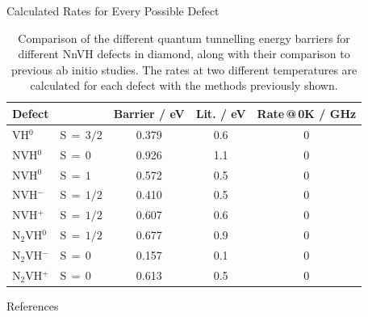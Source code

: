 \documentclass[final]{beamer}
\newlength{\sepwidth}
\newlength{\colwidth}
\newcommand{\separatorcolumn}{\begin{column}{\sepwidth}\end{column}}
\begin{document}
\begin{frame}[t]
\begin{columns}[t]
\begin{column}{\colwidth}
\begin{block}{Calculated Rates for Every Possible Defect}
    \begin{table}
      \centering
      \begin{tabular}{l l c c c}
        \toprule
        \textbf{Defect}& &\textbf{Barrier / eV} & \textbf{Lit. / eV} & \textbf{Rate\,@\,0K / GHz} \\
        \midrule
        VH$^{0}$ &S$\,=\,3/2$ & 0.379 & 0.6 & 0\\
        NVH$^{0}$ &S$\,=\,0$ & 0.926 & 1.1 & 0\\
        NVH$^{0}$ &S$\,=\,1$ & 0.572 & 0.5 & 0\\
        NVH$^{-}$ &S$\,=\,1/2$ & 0.410 & 0.5 & 0\\
        NVH$^{+}$ &S$\,=\,1/2$ & 0.607 & 0.6 & 0\\
        N$_2$VH$^{0}$ &S$\,=\,1/2$ & 0.677 & 0.9 & 0\\
        N$_2$VH$^{-}$ &S$\,=\,0$ & 0.157 & 0.1 & 0\\
        N$_2$VH$^{+}$ &S$\,=\,0$ & 0.613 & 0.5 & 0\\

        \bottomrule
      \end{tabular}
      \caption{Comparison of the different quantum tunnelling energy barriers for different NnVH defects in diamond, along with their comparison to previous ab initio studies. The rates at two different temperatures are calculated for each defect with the methods previously shown.}
    \end{table}
  \end{block}

  \begin{block}{References}

    \nocite{*}
    \footnotesize{}

  \end{block}

\end{column}

\separatorcolumn
\end{columns}
\end{frame}
\end{document}
